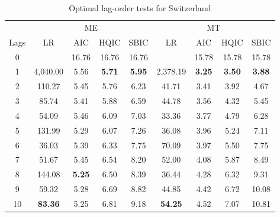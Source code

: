 \documentclass[a4paper, twoside]{templates/ociamthesis}
\begin{document}
\begin{table}[H]

\caption{\label{tab:TableC29}Optimal lag-order tests for Switzerland}
\centering
\fontsize{10}{12}\selectfont
\begin{tabular}[t]{ccccccccc}
\toprule
\multicolumn{1}{c}{ } & \multicolumn{4}{c}{ME} & \multicolumn{4}{c}{MT} \\
\cmidrule(l{3pt}r{3pt}){2-5} \cmidrule(l{3pt}r{3pt}){6-9}
Lags & LR & AIC & HQIC & SBIC & LR & AIC & HQIC & SBIC\\
\midrule
0 &  & 16.76 & 16.76 & 16.76 &  & 15.78 & 15.78 & 15.78\\
1 & 4,040.00 & 5.56 & \textbf{5.71} & \textbf{5.95} & 2,378.19 & \textbf{3.25} & \textbf{3.50} & \textbf{3.88}\\
2 & 110.27 & 5.45 & 5.76 & 6.23 & 41.71 & 3.41 & 3.92 & 4.67\\
3 & 85.74 & 5.41 & 5.88 & 6.59 & 44.78 & 3.56 & 4.32 & 5.45\\
4 & 54.09 & 5.46 & 6.09 & 7.03 & 33.36 & 3.77 & 4.79 & 6.28\\
5 & 131.99 & 5.29 & 6.07 & 7.26 & 36.08 & 3.96 & 5.24 & 7.11\\
6 & 36.03 & 5.39 & 6.33 & 7.75 & 70.09 & 3.97 & 5.50 & 7.75\\
7 & 51.67 & 5.45 & 6.54 & 8.20 & 52.00 & 4.08 & 5.87 & 8.49\\
8 & 144.08 & \textbf{5.25} & 6.50 & 8.39 & 36.44 & 4.28 & 6.32 & 9.31\\
9 & 59.32 & 5.28 & 6.69 & 8.82 & 44.85 & 4.42 & 6.72 & 10.08\\
10 & \textbf{83.36} & 5.25 & 6.81 & 9.18 & \textbf{54.25} & 4.52 & 7.07 & 10.81\\
\bottomrule
\end{tabular}
\end{table}
\end{document}
